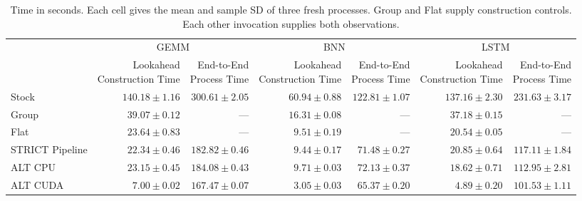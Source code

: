 \begin{table}[t]\centering\small\setlength{\tabcolsep}{4pt}
\caption{Time in seconds. Each cell gives the mean and sample SD of three fresh processes. Group and Flat supply construction controls. Each other invocation supplies both observations.}\label{tab:time}
\begin{tabular}{lrrrrrr}\toprule
 & \multicolumn{2}{c}{GEMM} & \multicolumn{2}{c}{BNN} & \multicolumn{2}{c}{LSTM}\\
 & \shortstack{Lookahead\\Construction Time} & \shortstack{End-to-End\\Process Time} & \shortstack{Lookahead\\Construction Time} & \shortstack{End-to-End\\Process Time} & \shortstack{Lookahead\\Construction Time} & \shortstack{End-to-End\\Process Time}\\\midrule
Stock & $140.18 \pm 1.16$ & $300.61 \pm 2.05$ & $60.94 \pm 0.88$ & $122.81 \pm 1.07$ & $137.16 \pm 2.30$ & $231.63 \pm 3.17$\\
Group & $39.07 \pm 0.12$ & --- & $16.31 \pm 0.08$ & --- & $37.18 \pm 0.15$ & ---\\
Flat & $23.64 \pm 0.83$ & --- & $9.51 \pm 0.19$ & --- & $20.54 \pm 0.05$ & ---\\
STRICT Pipeline & $22.34 \pm 0.46$ & $182.82 \pm 0.46$ & $9.44 \pm 0.17$ & $71.48 \pm 0.27$ & $20.85 \pm 0.64$ & $117.11 \pm 1.84$\\
ALT CPU & $23.15 \pm 0.45$ & $184.08 \pm 0.43$ & $9.71 \pm 0.03$ & $72.13 \pm 0.37$ & $18.62 \pm 0.71$ & $112.95 \pm 2.81$\\
ALT CUDA & $7.00 \pm 0.02$ & $167.47 \pm 0.07$ & $3.05 \pm 0.03$ & $65.37 \pm 0.20$ & $4.89 \pm 0.20$ & $101.53 \pm 1.11$\\
\bottomrule\end{tabular}\end{table}
